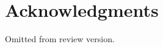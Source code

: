\documentclass{sigchi}
\begin{document}
\section{Acknowledgments}
Omitted from review version.


%
%
%
%
%
\balance



\end{document}
